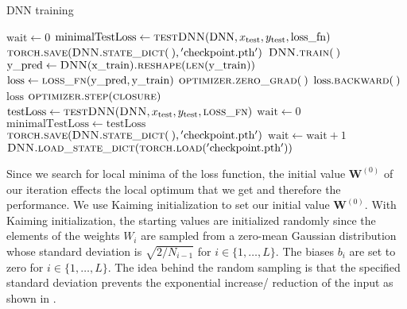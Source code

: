 \begin{algorithm}[H]%
\caption{\label{trainDNN}DNN training}
\begin{algorithmic}[1]
\State $\mathrm{wait} \gets 0$
\State $\mathrm{minimalTestLoss} \gets \Call{testDNN}{\mathrm{DNN}, x_\mathrm{test}, y_\mathrm{test}, \mathrm{loss\_fn}}$
\State $\Call{torch.save}{\textproc{DNN.state\_dict}(\:), \mathrm{'checkpoint.pth'}}$
\State $\Call{DNN.train}{\:}$
    \State $\mathrm{y\_pred} \gets \Call{DNN}{\mathrm{x\_train}}\textproc{.reshape}(\Call{len}{\mathrm{y\_train}})$
    \State $\mathrm{loss} \gets \Call{loss\_fn}{\mathrm{y\_pred}, \mathrm{y\_train}}$
    \State $\Call{optimizer.zero\_grad}{\:}$
    \State $\mathrm{loss.}\Call{backward}{\:}$
    \State \Return $\mathrm{loss}$
\EndFunction
\State $\Call{optimizer.step}{\textproc{closure}}$
\State $\mathrm{testLoss} \gets \Call{testDNN}{\textproc{DNN}, x_\mathrm{test}, y_\mathrm{test}, \textproc{loss\_fn}}$
\State $\mathrm{wait} \gets 0$
\State $\mathrm{minimalTestLoss} \gets \mathrm{testLoss}$
\State $\Call{torch.save}{\textproc{DNN.state\_dict}(\:), \mathrm{'checkpoint.pth'}}$
\Else
\State $\mathrm{wait} \gets \mathrm{wait}+1$
\EndIf
{}
\State $\Call{DNN.load\_state\_dict}{\textproc{torch.load}(\mathrm{'checkpoint.pth'})}$
\State \Return
\EndIf
\EndFor
\EndFunction
\end{algorithmic}
\end{algorithm}

Since we search for local minima of the loss function, the initial value $\mathbf{W}^{(0)}$ of our iteration effects the local optimum that we get and therefore the performance. We use Kaiming initialization \cite{7410480} to set our initial value $\mathbf{W}^{(0)}$. With Kaiming initialization, the starting values are initialized randomly since the elements of the weights $W_i$ are sampled from a zero-mean Gaussian distribution whose standard deviation is $\sqrt{2/N_{i-1}}$ for $i\in\{1,\dotsc,L\}$. The biases $b_i$ are set to zero for $i\in\{1,\dotsc,L\}$. The idea behind the random sampling is that the specified standard deviation prevents the exponential increase/ reduction of the input as shown in \cite{7410480}.


